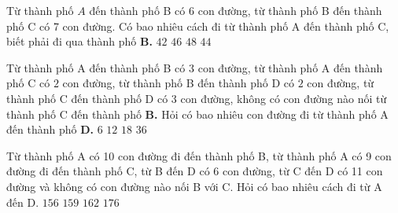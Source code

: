 \begin{ex}
	Từ thành phố $A$ đến thành phố B có 6 con đường, từ thành phố B đến thành phố C có 7 con đường. Có bao nhiêu cách đi từ thành phố A đến thành phố C, biết phải đi qua thành phố \textbf{B.}
	\choice
	{\True $42$}
	{$46$}
	{$48$}
	{$44$}
\end{ex}

\begin{ex}
	Từ thành phố A đến thành phố B có $3$ con đường, từ thành phố A đến thành phố C có $2$ con đường, từ thành phố B đến thành phố D có $2$ con đường, từ thành phố C đến thành phố D có $3$ con đường, không có con đường nào nối từ thành phố C đến thành phố \textbf{B.} Hỏi có bao nhiêu con đường đi từ thành phố A đến thành phố \textbf{D.}
	\choice
	{$6$}
	{\True $12$}
	{$18$}
	{$36$}
\end{ex}

\begin{ex}
	Từ thành phố A có 10 con đường đi đến thành phố B, từ thành phố A có 9 con đường đi đến thành phố C, từ B đến D có 6 con đường, từ C đến D có 11 con đường và không có con đường nào nối B với C. Hỏi có bao nhiêu cách đi từ A đến D.
	\choice
	{$156$}
	{\True $159$}
	{$162$}
	{$176$}
\end{ex}

